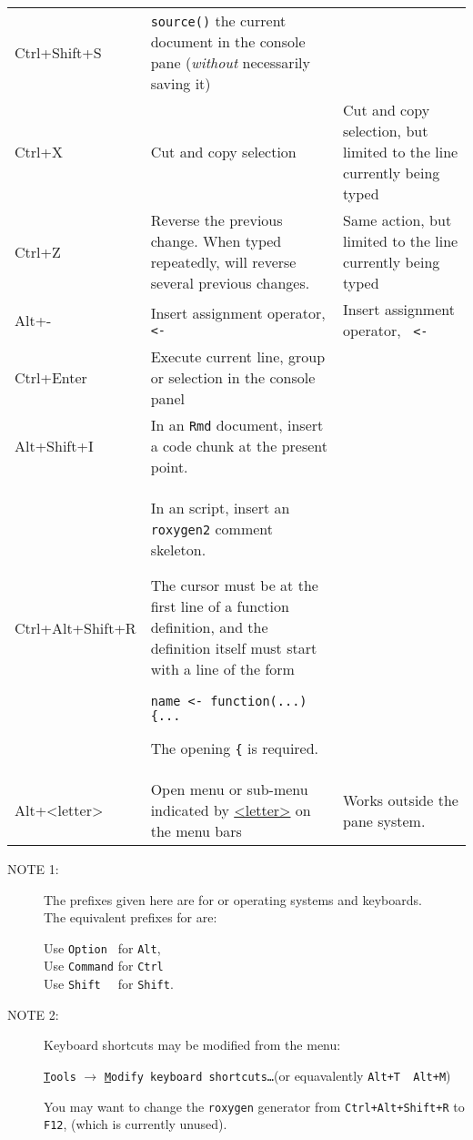 \documentclass[10.5pt]{article}
\begin{document}
\begin{xltabular}{1.0\linewidth}[!htp]{@{}lXX@{}}
  Ctrl+Shift+S & \texttt{source()} the current document  in
  the console pane (\emph{without} necessarily saving it)& \\
  Ctrl+X & Cut and copy selection & Cut and copy selection, but
  limited to the  line currently being typed\\
  Ctrl+Z & Reverse the previous change.  When typed repeatedly, will
  reverse several previous changes. & Same action, but limited to the
  line currently being typed\\
  Alt+- & Insert assignment operator, \texttt{ <- } & Insert
  assignment operator, \texttt{ <- }\\
  Ctrl+Enter & Execute current line, group or selection in the console
  panel & \\
  Alt+Shift+I & In an \texttt{Rmd} document, insert a code chunk at
  the present  point. & \\
  Ctrl+Alt+Shift+R & In an \R script, insert an \texttt{roxygen2}
  comment skeleton.\par
  The cursor must be at the first line of a function definition, and
  the definition itself must start with a line of the form\par
  \texttt{name <- function(...) \{...}\par
  The opening \texttt{\{} is required.&\\
  \midrule Alt+<letter> & Open menu or sub-menu indicated by
  \underline{<letter>} on the menu bars& Works outside
  the pane system.\\
  \bottomrule
\end{xltabular}

\begin{description}
\item[NOTE 1:] The prefixes given here are for \Windows or \Linux
  operating systems and keyboards.\\
  The equivalent prefixes for \MacOS are:

  Use \verb|Option | for \verb|Alt|,\\
  Use \verb|Command| for \verb|Ctrl|\\
  Use \verb|Shift  | for \verb|Shift|.
\item[NOTE 2:] Keyboard shortcuts may be modified from the menu:
  \begin{center}
    \texttt{\underline{T}ools} $\longrightarrow$ \texttt{\underline{M}odify keyboard shortcuts\dots}\quad (or
    equavalently \verb|Alt+T  Alt+M|)
  \end{center}
  You may want to change the \texttt{roxygen} generator from
  \verb|Ctrl+Alt+Shift+R| to \verb|F12|, (which is currently unused). 
\end{description}
\end{document}
